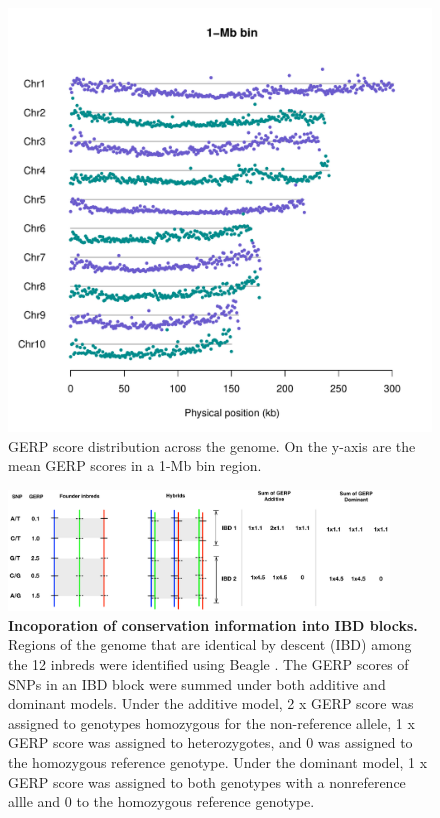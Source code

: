 \documentclass[9pt,twocolumn,twoside]{gsajnl}
\begin{document}
\begin{figure}[htbp]
\centering
\includegraphics[width=\linewidth]{SFig_gerp_dis1m.pdf}
\caption{GERP score distribution across the genome. On the y-axis are the mean GERP scores in a 1-Mb bin region.}
\label{fig:dis1m}
\end{figure}

\begin{figure}[here]
\includegraphics[width=0.9\textwidth]{SFig_gerpIBD.pdf}
\caption{
\textbf{Incoporation of conservation information into IBD blocks.}
Regions of the genome that are identical by descent (IBD) among the 12 inbreds were identified using Beagle \citep{Browning2009}.  The GERP scores of SNPs in an IBD block were summed under both additive and dominant models. Under the additive model, 2 x GERP score was assigned to genotypes homozygous for the non-reference allele, 1 x GERP score was assigned to heterozygotes, and 0 was assigned to the homozygous reference genotype. Under the dominant model, 1 x GERP score was assigned to both genotypes with a nonreference allle and 0 to the homozygous reference genotype.}
\label{fig:gerpibd}
\end{figure}
\end{document}
